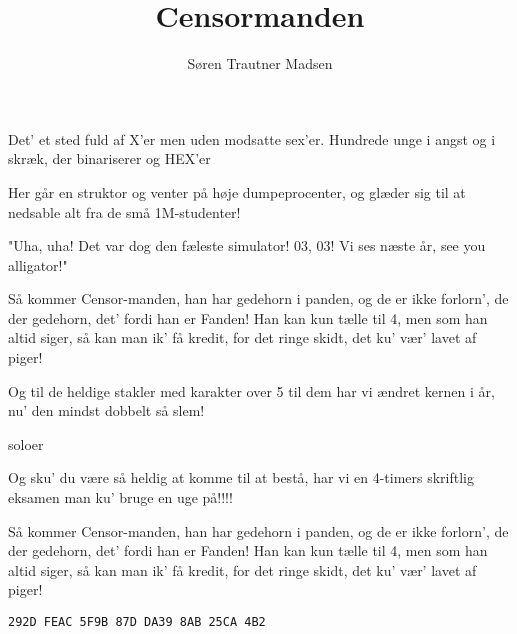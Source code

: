 \documentclass[10pt]{article}
\author{Søren Trautner Madsen}
\title{Censormanden}
\begin{document}
\maketitle

\begin{song}
 Det' et sted fuld af X'er \hfill{}
               men uden modsatte sex'er.
               Hundrede unge i angst og i skræk, \hfill{}
               der binariserer og HEX'er

               Her går en struktor og venter \hfill{}
               på høje dumpeprocenter, \hfill{}
               og glæder sig til at nedsable alt
               fra de små 1M-studenter! \hfill{}

               "Uha, uha! Det var dog den fæleste simulator! \hfill{}
               03, 03! Vi ses næste år, see you alligator!" \hfill{}
               
    Så kommer Censor-manden, \hfill{}
               han har gedehorn i panden,
 og de er ikke forlorn', 
               de der gedehorn, 
               det' fordi han er Fanden! \hfill{}
    Han kan kun tælle til 4, 
               men som han altid siger,
 så kan man ik' få kredit, 
               for det ringe skidt, 
               det ku' vær' lavet af piger! \hfill{}

   Og til de heldige stakler
               med karakter over 5 \hfill{}
               til dem har vi ændret kernen i år,
               nu' den mindst dobbelt så slem!

\scene soloer

   Og sku' du være så heldig
               at komme til at bestå,
               har vi en 4-timers skriftlig eksamen \hfill{}
               man ku' bruge en uge på!!!!

    Så kommer Censor-manden,
               han har gedehorn i panden,
 og de er ikke forlorn', 
               de der gedehorn, 
               det' fordi han er Fanden! \hfill{}
    Han kan kun tælle til 4, 
               men som han altid siger,
 så kan man ik' få kredit, 
               for det ringe skidt, 
               det ku' vær' lavet af piger! \hfill{}

{\large\verb|292D FEAC 5F9B 87D DA39 8AB 25CA 4B2|}
\end{song}
\end{document}
